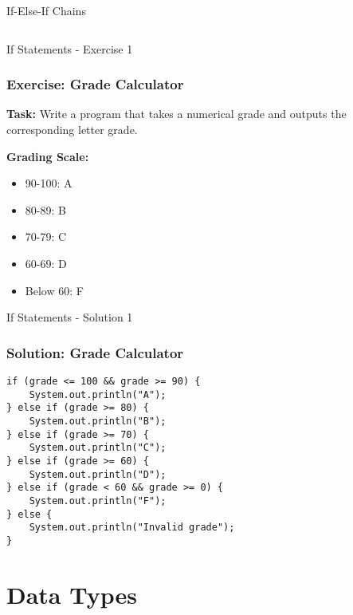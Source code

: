 \documentclass[aspectratio=169]{beamer}
\begin{document}
\begin{frame}[fragile]{If-Else-If Chains}
\begin{columns}
\begin{column}{0.5\textwidth}
\begin{center}
            \end{center}
        \end{column}
    \end{columns}
\end{frame}

\begin{frame}{If Statements - Exercise 1}
    \frametitle{Exercise: Grade Calculator}
    
    \textbf{Task:} Write a program that takes a numerical grade and outputs the corresponding letter grade.
    
    \vspace{1em}
    
    \textbf{Grading Scale:}
    \begin{itemize}
        \item 90-100: A
        \item 80-89: B
        \item 70-79: C
        \item 60-69: D
        \item Below 60: F
    \end{itemize}

\end{frame}

\begin{frame}[fragile]{If Statements - Solution 1}
    \frametitle{Solution: Grade Calculator}
    
    \begin{lstlisting}
if (grade <= 100 && grade >= 90) {
    System.out.println("A");
} else if (grade >= 80) {
    System.out.println("B");
} else if (grade >= 70) {
    System.out.println("C");
} else if (grade >= 60) {
    System.out.println("D");
} else if (grade < 60 && grade >= 0) {
    System.out.println("F");
} else {
    System.out.println("Invalid grade");
}

    \end{lstlisting}
    
\end{frame}

\section{Data Types}
\end{document}
